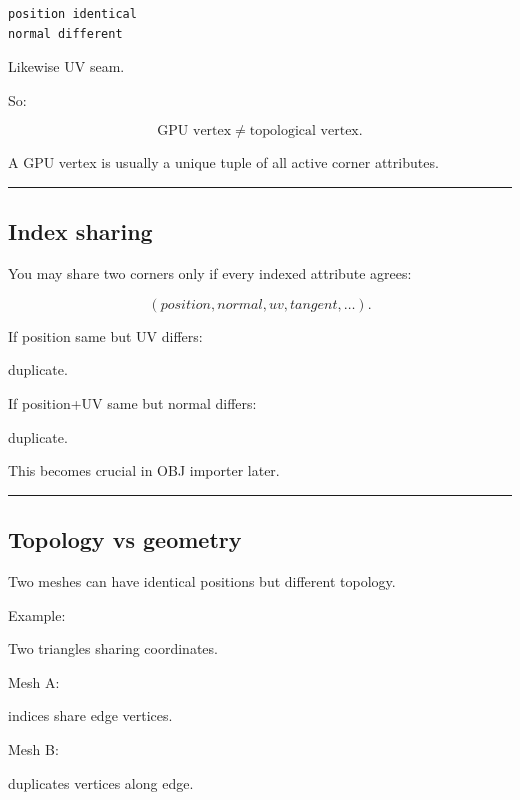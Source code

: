 \begin{verbatim}
position identical
normal different
\end{verbatim}

Likewise UV seam.

So:

\[
\boxed{
\text{GPU vertex}
\neq
\text{topological vertex}.
}
\]

A GPU vertex is usually a unique tuple of all active corner attributes.

\begin{center}\rule{0.5\linewidth}{0.5pt}\end{center}

\subsection{Index sharing}\label{04-visual-computing-ii-ch041-index-sharing}

\hypertarget{04-visual-computing-ii-ch041-index-sharing}{}

You may share two corners only if every indexed attribute agrees:

\[
(position,normal,uv,tangent,\ldots).
\]

If position same but UV differs:

duplicate.

If position+UV same but normal differs:

duplicate.

This becomes crucial in OBJ importer later.

\begin{center}\rule{0.5\linewidth}{0.5pt}\end{center}

\subsection{Topology vs geometry}\label{04-visual-computing-ii-ch041-topology-vs-geometry}

\hypertarget{04-visual-computing-ii-ch041-topology-vs-geometry}{}

Two meshes can have identical positions but different topology.

Example:

Two triangles sharing coordinates.

Mesh A:

indices share edge vertices.

Mesh B:

duplicates vertices along edge.

